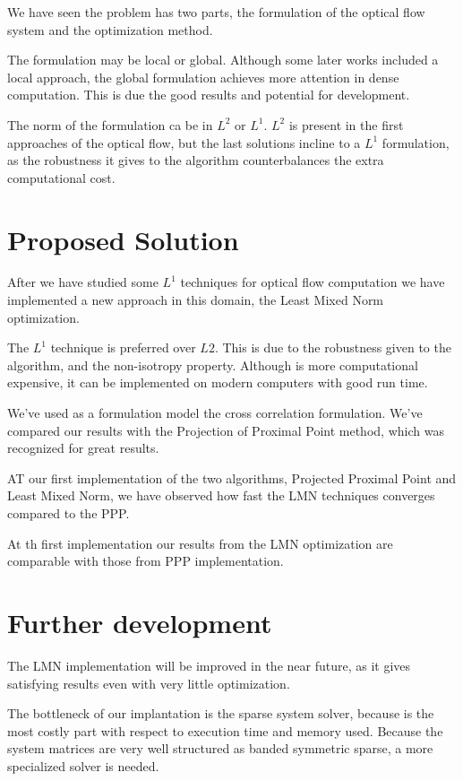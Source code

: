 \documentclass[12pt,a4paper,twoside]{report}
\begin{document}
{We have seen the problem has two parts, the formulation of the optical flow system and the optimization method.

The formulation may be local or global. Although some later works included a local approach, the global formulation achieves more attention in dense computation. This is due the good results and potential for development.

The norm of the formulation ca be in $L^2$ or $L^1$. $L^2$ is present in the first approaches of the optical flow, but the last solutions incline to a $L^1$ formulation, as the robustness it gives to the algorithm counterbalances the extra computational cost.

\section{Proposed Solution}

After we have studied some $L^1$ techniques for optical flow computation we have implemented a new approach in this domain, the Least Mixed Norm optimization.

The $L^1$ technique is preferred over $L2$. This is due to the robustness given to the algorithm, and the non-isotropy property. Although is more computational expensive, it can be implemented on modern computers with good run time.  

 We've used as a formulation model the cross correlation formulation. We've compared our results with the Projection of Proximal Point method, which was recognized for great results.
 
 AT our first implementation of the two algorithms, Projected Proximal Point and Least Mixed Norm, we have observed how fast the LMN techniques converges compared to the PPP.
 
 At th first implementation our results from the LMN optimization are comparable with those from PPP implementation. 

 


\section{Further development}

 
 The LMN implementation will be improved in the near future, as it gives satisfying results even with very little optimization. 
 
 The bottleneck of our implantation is the sparse system solver, because is the most costly part with respect to execution time and memory used. Because the system matrices are very well structured as banded symmetric sparse, a more specialized solver is needed.
 
}
\end{document}

